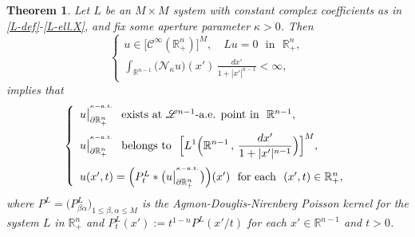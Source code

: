 \documentclass[11pt,reqno]{amsart}
\numberwithin{equation}{section}
\newtheorem{theorem}{Theorem}[section]
\theoremstyle{remark}
\begin{document}
\begin{theorem}\label{thm:FP}
Let $L$ be an $M\times M$ system with constant complex coefficients as in \eqref{L-def}-\eqref{L-ell.X}, 
and fix some aperture parameter $\kappa>0$. Then 
%
\begin{equation}\label{jk-lm-jhR-LLL-HM-RN.w}
\left\{
\begin{array}{l}
u\in\big[{\mathscr{C}}^{\infty}({\mathbb{R}}^n_{+})\big]^M,\quad Lu=0\,\,\text{ in }\,\,{\mathbb{R}}^n_{+},
\\[8pt]
\displaystyle
\int_{\mathbb{R}^{n-1}}\big({\mathcal{N}}_{\kappa}u\big)(x')\,\frac{dx'}{1+|x'|^{n-1}}<\infty,
\end{array}
\right.
\end{equation}
%
implies that 
%
\begin{eqnarray}\label{Tafva.2222}
\left\{
\begin{array}{l}
u\big|^{{}^{\kappa-{\rm n.t.}}}_{\partial{\mathbb{R}}^n_{+}}
\,\,\text{ exists at ${\mathscr{L}}^{n-1}$-a.e. point in }\,\,{\mathbb{R}}^{n-1},
\\[10pt]
\displaystyle
u\big|^{{}^{\kappa-{\rm n.t.}}}_{\partial{\mathbb{R}}^n_{+}}\,\,\text{ belongs to }\,\,
\Big[L^1\Big({\mathbb{R}}^{n-1}\,,\,\frac{dx'}{1+|x'|^{n-1}}\Big)\Big]^M,
\\[12pt]
u(x',t)=\Big(P^L_t\ast\big(u\big|^{{}^{\kappa-{\rm n.t.}}}_{\partial{\mathbb{R}}^n_{+}}\big)\Big)(x')
\,\,\text{ for each }\,\,(x',t)\in{\mathbb{R}}^n_{+},
\end{array}
\right.
\end{eqnarray}
%
where $P^L=\big(P^L_{\beta\alpha}\big)_{1\leq\beta,\alpha\leq M}$
is the Agmon-Douglis-Nirenberg Poisson kernel for the system $L$ in ${\mathbb{R}}^n_{+}$ 
and $P^L_t(x'):=t^{1-n}P^L(x'/t)$ for each $x'\in{\mathbb{R}}^{n-1}$ and $t>0$.


\end{theorem}
\end{document}
